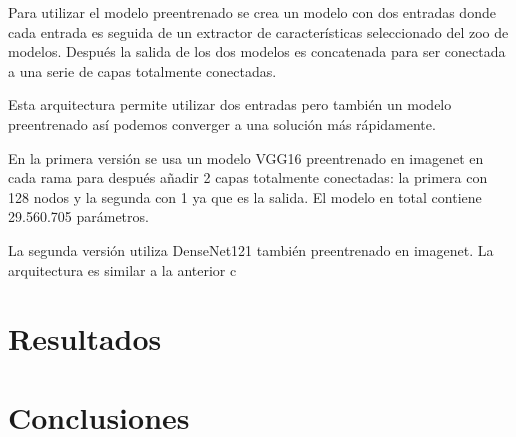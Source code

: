\documentclass[12pt]{article}
\begin{document}
    Para utilizar el modelo preentrenado se crea un modelo con dos entradas donde cada entrada es seguida de un
    extractor de características seleccionado del zoo de modelos. Después la salida de los dos modelos es concatenada
    para ser conectada a una serie de capas totalmente conectadas.
    
    Esta arquitectura permite utilizar dos entradas pero también un modelo preentrenado así podemos converger a una
    solución más rápidamente.
    
    En la primera versión se usa un modelo VGG16 preentrenado en imagenet en cada rama para después añadir 2 capas
    totalmente conectadas: la primera con 128 nodos y la segunda con 1 ya que es la salida. El modelo en total contiene 
    29.560.705 parámetros.
    
    La segunda versión utiliza DenseNet121 también preentrenado en imagenet. La arquitectura es similar a la anterior c


    \section{Resultados}


    \section{Conclusiones}

    \newpage
    
    
\end{document}
